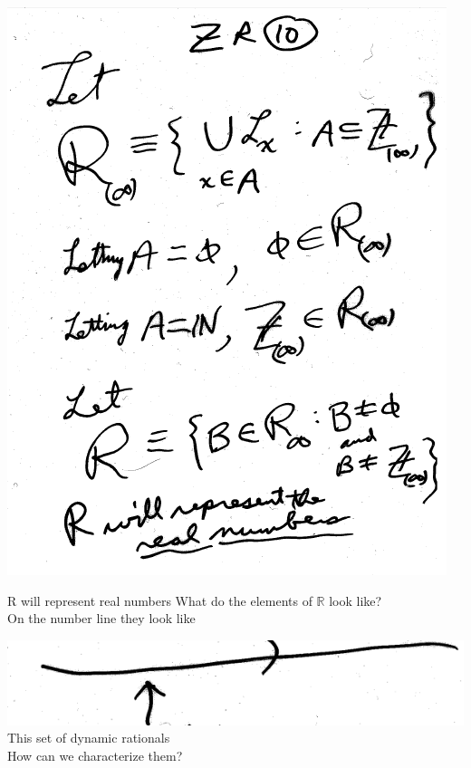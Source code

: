 \documentclass[10pt,a4paper]{article}
\begin{document}
{{\includegraphics[scale=0.6]{pages/ZR10.png}

R will represent real numbers 
What do the elements of $\mathbb{R}$ look like? 
\\On the number line they look like

\includegraphics[scale=.5]{Pages/ZR_11_im1}
\\This set of dynamic rationals
\\How can we characterize them?

}}
\end{document}
